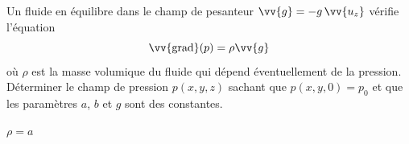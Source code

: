 

\finEntrainement







\hauteurLargeurCadreReponse		{8mm}{5cm}
\typeEntrainement				{} %
\initialisationEntrainement

Un fluide en équilibre dans le champ de pesanteur $\vv{g}=-g\,\vv{u_z}$ vérifie l'équation 
$$
\vv{\text{grad}}(p)=\rho \vv{g}
$$
où $\rho$ est la masse volumique du fluide qui dépend éventuellement de la pression. Déterminer le champ de pression $p(x,y,z)$ sachant que $p(x,y,0)=p_0$ et que les paramètres $a$, $b$ et $g$ sont des constantes.
\debutEntrainement




\begin{enonce}
$\rho=a$
\end{enonce}





